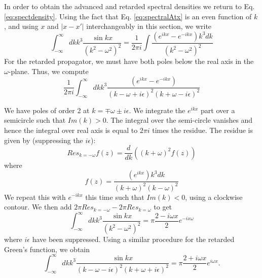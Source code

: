 \documentclass[aps,preprintnumbers,superscriptaddress,longbibliography]{revtex4-1}
\begin{document}
In order to obtain the advanced and retarded spectral densities we 
return to Eq. \eqref{eq:spectdensity}. Using the fact that Eq. \eqref{eq:spectralAtx}  is an even function of $k$, and using $x$ and $|x-x'|$ interchangeably in this section, we write
\begin{equation}
  \int^{\infty}_{-\infty} dk k^3 \frac{\sin{kx}}{(k^2-\omega^2)^2} = \frac{1}{2\pi i}\int \frac{(e^{ikx}-e^{-ikx}) k^3 dk}{(k^2-\omega^2)^2}
\end{equation}
For the retarded propagator, we
must have both poles below the real axis in the $\omega$-plane. Thus, we compute
\begin{equation}
   \frac{1}{2\pi i} \int^{\infty}_{-\infty} dk k^3 \frac{(e^{ikx}-e^{-ikx})}{(k-\omega+i\epsilon)^2(k+\omega-i\epsilon)^2}
\end{equation}

We have poles of order 2 at $k=\mp \omega \pm i\epsilon$. 
We integrate the $e^{ikx}$ part over a semicircle such that $Im(k)>0$. The
integral over the semi-circle vanishes and hence the integral over real axis is equal to $2\pi i$ times the residue.   
The residue is given by (suppressing the $i\epsilon$):
\begin{equation}
    Res_{k=-\omega}f(z)=\frac{d}{dk}((k+\omega)^2f(z))
\end{equation}
where 
\begin{equation}
    f(z) = \frac{(e^{ikx}) k^3 dk}{(k+\omega)^2(k-\omega)^2}
\end{equation}
We repeat this with $e^{-ikx}$ this time such that $Im(k)<0$, using a clockwise contour. We then add $2\pi Res_{k=-\omega}-2\pi Res_{k=\omega}$  to get
\begin{equation}
   \int^{\infty}_{-\infty} dk k^3 \frac{\sin{kx}}{(k^2-\omega^2)^2}=\pi\frac{2-i\omega x}{2}e^{-ix\omega}
   \label{eq:advancedSD}
\end{equation}
where $i\epsilon$ have been suppressed.
Using a similar procedure for the retarded Green's function, we obtain  \begin{equation}
    \int^{\infty}_{-\infty} dk k^3 \frac{\sin{kx}}{(k-\omega-i\epsilon)^2(k+\omega+i\epsilon)^2}= \pi \frac{2+i \omega x}{2} e^{i \omega x}.
    \label{eq:retardedSD}
\end{equation}

\end{document}
